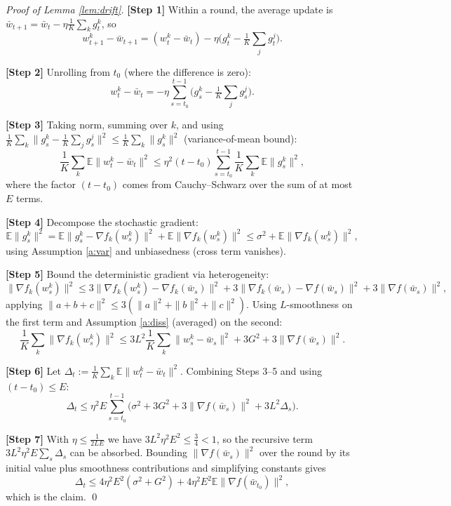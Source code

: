 \documentclass[11pt]{article}
\begin{document}
\begin{proof}[Proof of Lemma \ref{lem:drift}]
\textbf{[Step 1]} Within a round, the average update is
$\bar w_{t+1} = \bar w_t - \eta \frac{1}{K}\sum_k g_t^k$, so
\[
w_{t+1}^k - \bar w_{t+1}
= (w_t^k - \bar w_t) - \eta\Big(g_t^k - \tfrac{1}{K}\sum_j g_t^j\Big).
\]

\textbf{[Step 2]} Unrolling from $t_0$ (where the difference is zero):
\[
w_t^k - \bar w_t
= -\eta \sum_{s=t_0}^{t-1}\Big(g_s^k - \tfrac{1}{K}\sum_j g_s^j\Big).
\]

\textbf{[Step 3]} Taking norm, summing over $k$, and using
$\frac{1}{K}\sum_k \|g_s^k - \frac1K\sum_j g_s^j\|^2
\le \frac{1}{K}\sum_k \|g_s^k\|^2$ (variance-of-mean bound):
\[
\frac{1}{K}\sum_k \mathbb{E}\|w_t^k - \bar w_t\|^2
\le \eta^2 (t-t_0) \sum_{s=t_0}^{t-1}
   \frac{1}{K}\sum_k \mathbb{E}\|g_s^k\|^2,
\]
where the factor $(t-t_0)$ comes from Cauchy--Schwarz over the sum of at most
$E$ terms.

\textbf{[Step 4]} Decompose the stochastic gradient:
\[
\mathbb{E}\|g_s^k\|^2
= \mathbb{E}\|g_s^k - \nabla f_k(w_s^k)\|^2
 + \mathbb{E}\|\nabla f_k(w_s^k)\|^2
\le \sigma^2 + \mathbb{E}\|\nabla f_k(w_s^k)\|^2,
\]
using Assumption \ref{a:var} and unbiasedness (cross term vanishes).

\textbf{[Step 5]} Bound the deterministic gradient via heterogeneity:
\[
\|\nabla f_k(w_s^k)\|^2
\le 3\|\nabla f_k(w_s^k) - \nabla f_k(\bar w_s)\|^2
 + 3\|\nabla f_k(\bar w_s) - \nabla f(\bar w_s)\|^2
 + 3\|\nabla f(\bar w_s)\|^2,
\]
applying $\|a+b+c\|^2 \le 3(\|a\|^2+\|b\|^2+\|c\|^2)$.
Using $L$-smoothness on the first term and Assumption \ref{a:diss} (averaged)
on the second:
\[
\frac{1}{K}\sum_k \|\nabla f_k(w_s^k)\|^2
\le 3L^2 \frac{1}{K}\sum_k\|w_s^k - \bar w_s\|^2
 + 3G^2 + 3\|\nabla f(\bar w_s)\|^2.
\]

\textbf{[Step 6]} Let $\Delta_t := \frac1K\sum_k \mathbb{E}\|w_t^k-\bar w_t\|^2$.
Combining Steps 3--5 and using $(t-t_0)\le E$:
\[
\Delta_t
\le \eta^2 E \sum_{s=t_0}^{t-1}
\Big(\sigma^2 + 3G^2 + 3\|\nabla f(\bar w_s)\|^2 + 3L^2 \Delta_s\Big).
\]

\textbf{[Step 7]} With $\eta \le \tfrac{1}{2LE}$ we have
$3 L^2 \eta^2 E^2 \le \tfrac34 < 1$, so the recursive term
$3L^2\eta^2 E \sum_s \Delta_s$ can be absorbed. Bounding
$\|\nabla f(\bar w_s)\|^2$ over the round by its initial value plus smoothness
contributions and simplifying constants gives
\[
\Delta_t \le 4\eta^2 E^2(\sigma^2 + G^2)
 + 4\eta^2 E^2 \mathbb{E}\|\nabla f(\bar w_{t_0})\|^2,
\]
which is the claim. \qed
\end{proof}
\end{document}
